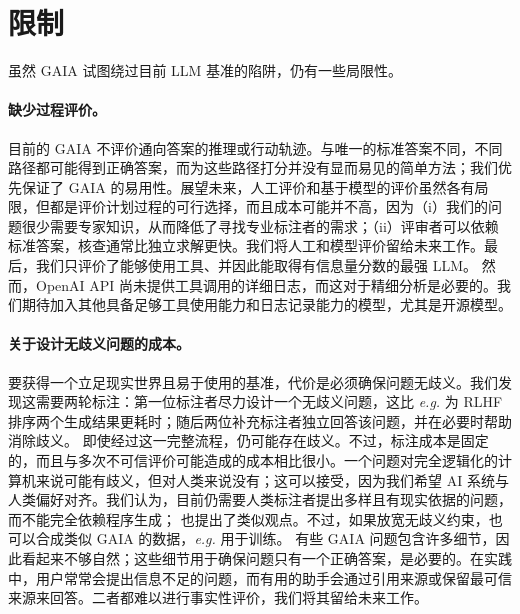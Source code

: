 \documentclass{fairmeta}
\newcommand{\benchmark}{\textsc{GAIA}}
\begin{document}
\vspace{-.3cm}

\section{限制} 
\label{sec:limitations}

\vspace{-.2cm}

虽然 \benchmark{} 试图绕过目前 LLM 基准的陷阱，仍有一些局限性。

\vspace{-.2cm}

\paragraph{缺少过程评价。} 目前的 \benchmark{} 不评价通向答案的推理或行动轨迹。与唯一的标准答案不同，不同路径都可能得到正确答案，而为这些路径打分并没有显而易见的简单方法；我们优先保证了 \benchmark{} 的易用性。展望未来，人工评价和基于模型的评价虽然各有局限，但都是评价计划过程的可行选择，而且成本可能并不高，因为（i）我们的问题很少需要专家知识，从而降低了寻找专业标注者的需求；（ii）评审者可以依赖标准答案，核查通常比独立求解更快。我们将人工和模型评价留给未来工作。最后，我们只评价了能够使用工具、并因此能取得有信息量分数的最强 LLM。
然而，OpenAI API 尚未提供工具调用的详细日志，而这对于精细分析是必要的。我们期待加入其他具备足够工具使用能力和日志记录能力的模型，尤其是开源模型。

\vspace{-.2cm}

\paragraph{关于设计无歧义问题的成本。} 要获得一个立足现实世界且易于使用的基准，代价是必须确保问题无歧义。我们发现这需要两轮标注：第一位标注者尽力设计一个无歧义问题，这比 \textit{e.g.} 为 RLHF 排序两个生成结果更耗时；随后两位补充标注者独立回答该问题，并在必要时帮助消除歧义。
即使经过这一完整流程，仍可能存在歧义。不过，标注成本是固定的，而且与多次不可信评价可能造成的成本相比很小。一个问题对完全逻辑化的计算机来说可能有歧义，但对人类来说没有；这可以接受，因为我们希望 AI 系统与人类偏好对齐。我们认为，目前仍需要人类标注者提出多样且有现实依据的问题，而不能完全依赖程序生成；\citet{chollet2019measure} 也提出了类似观点。不过，如果放宽无歧义约束，也可以合成类似 GAIA 的数据，\textit{e.g.} 用于训练。
有些 \benchmark{} 问题包含许多细节，因此看起来不够自然；这些细节用于确保问题只有一个正确答案，是必要的。在实践中，用户常常会提出信息不足的问题，而有用的助手会通过引用来源或保留最可信来源来回答。二者都难以进行事实性评价，我们将其留给未来工作。
\end{document}
